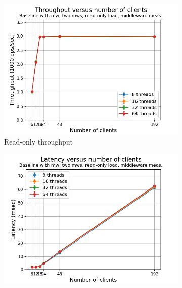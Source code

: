 \documentclass[11pt,a4paper]{article}
\begin{document}

\begin{figure}[h]
\centering
\begin{subfigure}{.5\textwidth}
  \centering
  \includegraphics[width=1.0\linewidth,trim={5px 0px 20px 0px},clip]{img/plot/mwb2-ro-tp_mw.png}
  \caption{Read-only throughput}
  \label{fig:mwb2-ro-tp_mw}
\end{subfigure}%
\begin{subfigure}{.5\textwidth}
  \centering
  \includegraphics[width=1.0\linewidth,trim={5px 0px 20px 0px},clip]{img/plot/mwb2-ro-lat_mw}

\end{subfigure}
\end{figure}
\end{document}
